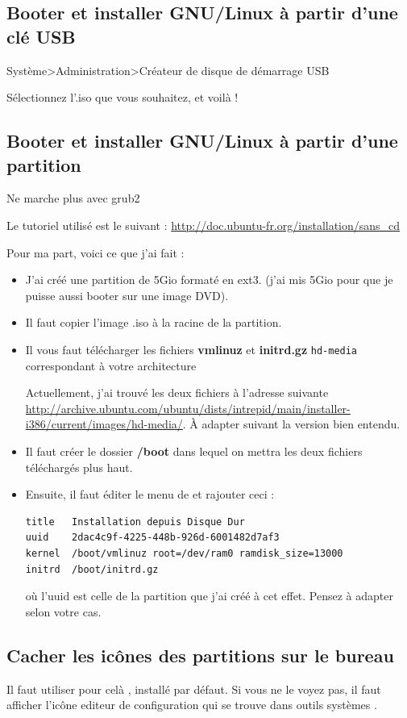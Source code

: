 \documentclass[a4paper,twoside]{article}
\begin{document}
\subsection{Booter et installer GNU/Linux à partir d'une clé USB}
Système>Administration>Créateur de disque de démarrage USB

Sélectionnez l'.iso que vous souhaitez, et voilà !

\subsection{Booter et installer GNU/Linux à partir d'une partition}\label{sec:hd-media}
{\red Ne marche plus avec grub2}

Le tutoriel utilisé est le suivant : \url{http://doc.ubuntu-fr.org/installation/sans_cd}

Pour ma part, voici ce que j'ai fait :
\begin{itemize}
\item J'ai créé une partition de 5Gio formaté en ext3. (j'ai mis 5Gio pour que je puisse aussi booter sur une image DVD).
\item Il faut copier l'image .iso à la racine de la partition.
\item Il vous faut télécharger les fichiers \textbf{vmlinuz} et \textbf{initrd.gz} \texttt{hd-media} correspondant à votre architecture

\begin{remarque}
Actuellement, j'ai trouvé les deux fichiers à l'adresse suivante \url{http://archive.ubuntu.com/ubuntu/dists/intrepid/main/installer-i386/current/images/hd-media/}. À adapter suivant la version bien entendu.
\end{remarque}
\item Il faut créer le dossier \textbf{/boot} dans lequel on mettra les deux fichiers téléchargés plus haut.
\item Ensuite, il faut éditer le menu de  et rajouter ceci :

\begin{verbatim}
title	Installation depuis Disque Dur
uuid	2dac4c9f-4225-448b-926d-6001482d7af3
kernel	/boot/vmlinuz root=/dev/ram0 ramdisk_size=13000
initrd	/boot/initrd.gz
\end{verbatim}

où l'uuid est celle de la partition que j'ai créé à cet effet. Pensez à adapter selon votre cas.
\end{itemize}

\subsection{Cacher les icônes des partitions sur le bureau}
Il faut utiliser pour celà , installé par défaut. Si vous ne le voyez pas, il faut afficher l'icône \og editeur de configuration \fg   qui se trouve dans \og outils systèmes \fg.
\end{document}
